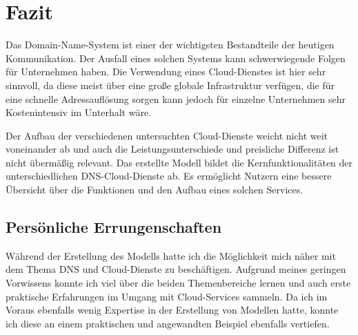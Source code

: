 \section{Fazit}
Das Domain-Name-System ist einer der wichtigsten Bestandteile der heutigen Kommunikation. Der Ausfall eines solchen Systems kann schwerwiegende Folgen für Unternehmen haben. Die Verwendung eines Cloud-Dienstes ist hier sehr sinnvoll, da diese meist über eine große globale Infrastruktur verfügen, die für eine schnelle Adressauflösung sorgen kann jedoch für einzelne Unternehmen sehr Kostenintensiv im Unterhalt wäre.

Der Aufbau der verschiedenen untersuchten Cloud-Dienste weicht nicht weit voneinander ab und auch die Leistungsunterschiede und preisliche Differenz ist nicht übermäßig relevant. Das erstellte Modell bildet die Kernfunktionalitäten der unterschiedlichen DNS-Cloud-Dienste ab. Es ermöglicht Nutzern eine bessere Übersicht über die Funktionen und den Aufbau eines solchen Services. 

\subsection{Persönliche Errungenschaften}
Während der Erstellung des Modells hatte ich die Möglichkeit mich näher mit dem Thema DNS und Cloud-Dienste zu beschäftigen. Aufgrund meines geringen Vorwissens konnte ich viel über die beiden Themenbereiche lernen und auch erste praktische Erfahrungen im Umgang mit Cloud-Services sammeln. Da ich im Voraus ebenfalls wenig Expertise in der Erstellung von Modellen hatte, konnte ich diese an einem praktischen und angewandten Beispiel ebenfalls vertiefen.
